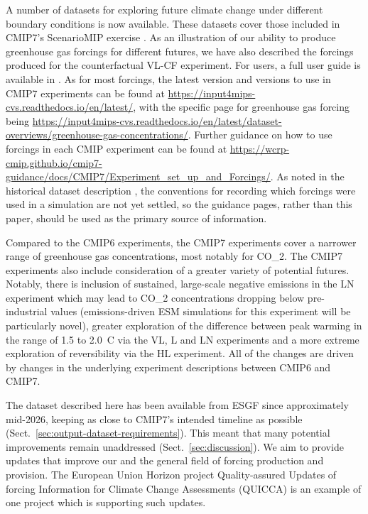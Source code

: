A number of datasets for exploring future climate change under different boundary conditions is now available.
These datasets cover those included in CMIP7's ScenarioMIP exercise \citep{van-vuuren_scenariomip_2026,riahi_new-ssps-overview_2026}.
As an illustration of our ability to produce greenhouse gas forcings
for different futures, we have also described the forcings produced for the counterfactual VL-CF experiment.
For users, a full user guide is available in \citet{nicholls_scenario-user-guide_2026}.
As for most forcings, the latest version
and versions to use in CMIP7 experiments can be found at
\url{https://input4mips-cvs.readthedocs.io/en/latest/},
with the specific page for greenhouse gas forcing being
\newline \mbox{\url{https://input4mips-cvs.readthedocs.io/en/latest/dataset-overviews/greenhouse-gas-concentrations/}}.
Further guidance on how to use forcings in each CMIP experiment can be found at
\newline \mbox{\url{https://wcrp-cmip.github.io/cmip7-guidance/docs/CMIP7/Experiment_set_up_and_Forcings/}}.
As noted in the historical dataset description \citep{nicholls_historical-ghgs_2026},
the conventions for recording which forcings were used in a simulation are not yet settled,
so the guidance pages, rather than this paper, should be used as the primary source of information.

Compared to the CMIP6 experiments,
the CMIP7 experiments cover a narrower range of greenhouse gas concentrations,
most notably for CO_2.
The CMIP7 experiments also include consideration of a greater variety of potential futures.
Notably, there is inclusion of sustained, large-scale negative emissions in the LN experiment
which may lead to CO_2 concentrations dropping below pre-industrial values
(emissions-driven ESM simulations for this experiment will be particularly novel),
greater exploration of the difference between peak warming in the range of 1.5 to 2.0\textdegree~C via the VL, L and LN experiments
and a more extreme exploration of reversibility via the HL experiment.
All of the changes are driven by changes in the underlying experiment descriptions between CMIP6 and CMIP7.

The dataset described here has been available from ESGF since approximately mid-2026,
keeping as close to CMIP7's intended timeline as possible (Sect.~\ref{sec:output-dataset-requirements}).
This meant that many potential improvements remain unaddressed (Sect.~\ref{sec:discussion}).
We aim to provide updates that improve our and the general field of forcing production and provision.
The European Union Horizon project Quality-assured Updates of forcing Information for Climate Change Assessments (QUICCA)
is an example of one project which is supporting such updates.
